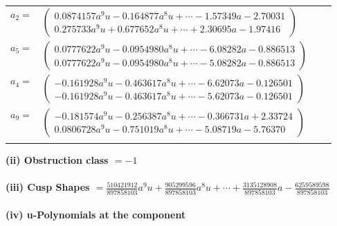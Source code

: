 \documentclass[1p]{elsarticle_modified}
\theoremstyle{definition}
\begin{document}
\begin{tabular}{m{7pt} m{180pt} m{7pt} m{180pt} }
\flushright $a_{2}=$&$\begin{pmatrix}0.0874157 a^{9} u-0.164877 a^{8} u+\cdots-1.57349 a-2.70031\\0.275733 a^{9} u+0.677652 a^{8} u+\cdots+2.30695 a-1.97416\end{pmatrix}$ \\
\flushright $a_{5}=$&$\begin{pmatrix}0.0777622 a^{9} u-0.0954980 a^{8} u+\cdots-6.08282 a-0.886513\\0.0777622 a^{9} u-0.0954980 a^{8} u+\cdots-5.08282 a-0.886513\end{pmatrix}$ \\
\flushright $a_{4}=$&$\begin{pmatrix}-0.161928 a^{9} u-0.463617 a^{8} u+\cdots-6.62073 a-0.126501\\-0.161928 a^{9} u-0.463617 a^{8} u+\cdots-5.62073 a-0.126501\end{pmatrix}$ \\
\flushright $a_{9}=$&$\begin{pmatrix}-0.181574 a^{9} u-0.256387 a^{8} u+\cdots-0.366731 a+2.33724\\0.0806728 a^{9} u-0.751019 a^{8} u+\cdots-5.08719 a-5.76370\end{pmatrix}$\\&\end{tabular}
\flushleft \textbf{(ii) Obstruction class $= -1$}\\~\\
\flushleft \textbf{(iii) Cusp Shapes $= \frac{510421912}{897858103} a^9 u+\frac{905299596}{897858103} a^8 u+\cdots+\frac{3135128908}{897858103} a-\frac{6259589598}{897858103}$}\\~\\
\newpage\renewcommand{\arraystretch}{1}
\flushleft \textbf{(iv) u-Polynomials at the component}\newline \\
\end{document}
